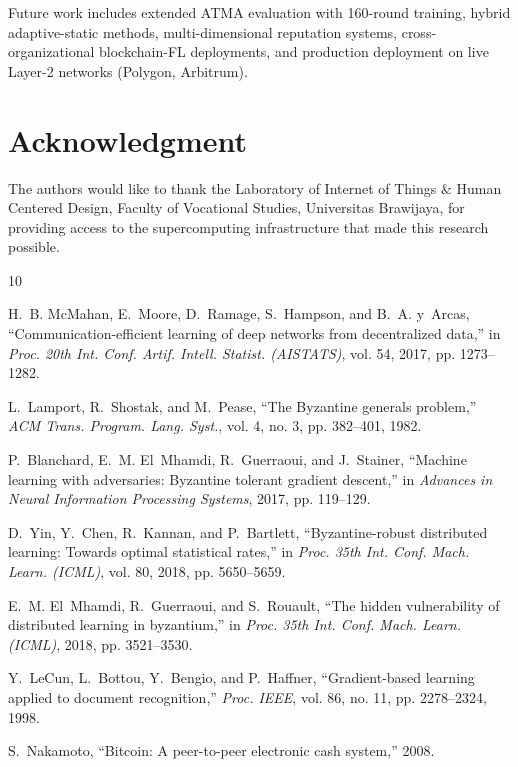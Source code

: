 \documentclass[12pt,a4paper,onecolumn]{article}
\begin{document}
Future work includes extended ATMA evaluation with 160-round training, hybrid adaptive-static methods, multi-dimensional reputation systems, cross-organizational blockchain-FL deployments, and production deployment on live Layer-2 networks (Polygon, Arbitrum).

\section*{Acknowledgment}

The authors would like to thank the Laboratory of Internet of Things \& Human Centered Design, Faculty of Vocational Studies, Universitas Brawijaya, for providing access to the supercomputing infrastructure that made this research possible.


\begin{thebibliography}{10}

H.~B. McMahan, E.~Moore, D.~Ramage, S.~Hampson, and B.~A. y~Arcas,
``Communication-efficient learning of deep networks from decentralized data,''
in \emph{Proc. 20th Int. Conf. Artif. Intell. Statist. (AISTATS)}, vol. 54, 2017, pp. 1273--1282.

L.~Lamport, R.~Shostak, and M.~Pease,
``The Byzantine generals problem,''
\emph{ACM Trans. Program. Lang. Syst.}, vol. 4, no. 3, pp. 382--401, 1982.

P.~Blanchard, E.~M. El~Mhamdi, R.~Guerraoui, and J.~Stainer,
``Machine learning with adversaries: Byzantine tolerant gradient descent,''
in \emph{Advances in Neural Information Processing Systems}, 2017, pp. 119--129.

D.~Yin, Y.~Chen, R.~Kannan, and P.~Bartlett,
``Byzantine-robust distributed learning: Towards optimal statistical rates,''
in \emph{Proc. 35th Int. Conf. Mach. Learn. (ICML)}, vol. 80, 2018, pp. 5650--5659.

E.~M. El~Mhamdi, R.~Guerraoui, and S.~Rouault,
``The hidden vulnerability of distributed learning in byzantium,''
in \emph{Proc. 35th Int. Conf. Mach. Learn. (ICML)}, 2018, pp. 3521--3530.

Y.~LeCun, L.~Bottou, Y.~Bengio, and P.~Haffner,
``Gradient-based learning applied to document recognition,''
\emph{Proc. IEEE}, vol. 86, no. 11, pp. 2278--2324, 1998.

S.~Nakamoto,
``Bitcoin: A peer-to-peer electronic cash system,'' 2008.


\end{thebibliography}
\end{document}
